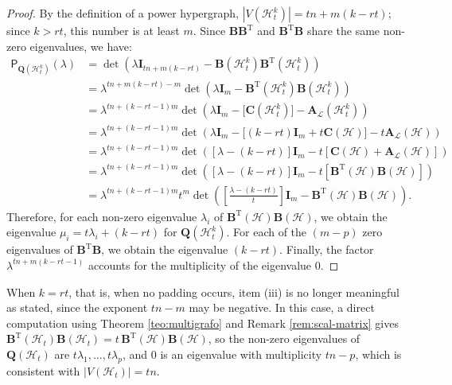 \documentclass[12pt,reqno]{amsart}
\begin{document}
\begin{proof}
By the definition of a power hypergraph, $|V(\mathcal{H}^k_t)| = tn + m(k-rt)$; since $k > rt$, this number is at least $m$. Since $\mathbf{B}\mathbf{B}^\mathrm{T}$ and $\mathbf{B}^\mathrm{T}\mathbf{B}$ share the same non-zero eigenvalues, we have:
\begin{align*}
\mathsf{P}_{\mathbf{Q}(\mathcal{H}^k_t)}(\lambda) 
&= \det(\lambda\mathbf{I}_{tn+m(k-rt)}-\mathbf{B}(\mathcal{H}^k_t)\mathbf{B}^\mathrm{T}(\mathcal{H}^k_t))\\
&= \lambda^{tn+m(k-rt)-m}\det(\lambda\mathbf{I}_m - \mathbf{B}^\mathrm{T}(\mathcal{H}^k_t)\mathbf{B}(\mathcal{H}^k_t))\\
&= \lambda^{tn+(k-rt-1)m}\det\left(\lambda\mathbf{I}_m - \big[\mathbf{C}(\mathcal{H}^k_t)\big] - \mathbf{A}_{\mathcal{L}}(\mathcal{H}^k_t) \right) \\
&= \lambda^{tn+(k-rt-1)m}\det\left(\lambda\mathbf{I}_m - \big[(k-rt)\mathbf{I}_m + t\mathbf{C}(\mathcal{H})\big]- t\mathbf{A}_{\mathcal{L}}(\mathcal{H}) \right)\\
&= \lambda^{tn+(k-rt-1)m}\det\left([\lambda-(k-rt)]\mathbf{I}_m - t[\mathbf{C}(\mathcal{H})+\mathbf{A}_{\mathcal{L}}(\mathcal{H})] \right)\\
&= \lambda^{tn+(k-rt-1)m}\det\left([\lambda-(k-rt)]\mathbf{I}_m - t[\mathbf{B}^\mathrm{T}(\mathcal{H})\mathbf{B}(\mathcal{H})] \right)\\
&= \lambda^{tn+(k-rt-1)m} t^m\det\left(\left[ \frac{\lambda-(k-rt)}{t}\right] \mathbf{I}_m -\mathbf{B}^\mathrm{T}(\mathcal{H})\mathbf{B}(\mathcal{H}) \right).
\end{align*}
Therefore, for each non-zero eigenvalue $\lambda_i$ of $\mathbf{B}^\mathrm{T}(\mathcal{H})\mathbf{B}(\mathcal{H})$, we obtain the eigenvalue $\mu_i = t\lambda_i + (k-rt)$ for $\mathbf{Q}(\mathcal{H}^k_t)$. For each of the $(m-p)$ zero eigenvalues of $\mathbf{B}^\mathrm{T}\mathbf{B}$, we obtain the eigenvalue $(k-rt)$. Finally, the factor $\lambda^{tn+m(k-rt-1)}$ accounts for the multiplicity of the eigenvalue $0$.
\end{proof}

\begin{remark}
When $k = rt$, that is, when no padding occurs, item (iii) is no longer meaningful as stated, since the exponent $tn - m$ may be negative. In this case, a direct computation using Theorem \ref{teo:multigrafo} and Remark \ref{rem:scal-matrix} gives $\mathbf{B}^\mathrm{T}(\mathcal{H}_t)\mathbf{B}(\mathcal{H}_t) = t\,\mathbf{B}^\mathrm{T}(\mathcal{H})\mathbf{B}(\mathcal{H})$, so the non-zero eigenvalues of $\mathbf{Q}(\mathcal{H}_t)$ are $t\lambda_1, \ldots, t\lambda_p$, and $0$ is an eigenvalue with multiplicity $tn - p$, which is consistent with $|V(\mathcal{H}_t)| = tn$.
\end{remark}
\end{document}
